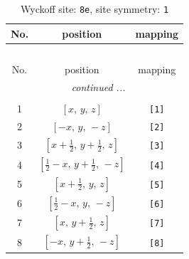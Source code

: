 \documentclass[fleqn,8pt]{jsarticle}
\begin{document}
\renewcommand{\arraystretch}{1.2}
\begin{longtable}{ccc}
\caption{Wyckoff site: {\tt 8e}, site symmetry: {\tt 1}}
 \\
 \hline \hline
No. & position & mapping \\ \hline \endfirsthead

\multicolumn{2}{l}{\tablename\ \thetable{}} \\
 \hline \hline
No. & position & mapping \\ \hline \endhead

 \hline \hline
\multicolumn{2}{r}{\footnotesize\it continued ...} \\ \endfoot

 \hline \hline
\multicolumn{2}{r}{} \\ \endlastfoot

1 & $\left[ x,\, y,\, z \right]$ & {\tt [1]} \\ \hline
2 & $\left[ - x,\, y,\, - z \right]$ & {\tt [2]} \\ \hline
3 & $\left[ x + \frac{1}{2},\, y + \frac{1}{2},\, z \right]$ & {\tt [3]} \\ \hline
4 & $\left[ \frac{1}{2} - x,\, y + \frac{1}{2},\, - z \right]$ & {\tt [4]} \\ \hline
5 & $\left[ x + \frac{1}{2},\, y,\, z \right]$ & {\tt [5]} \\ \hline
6 & $\left[ \frac{1}{2} - x,\, y,\, - z \right]$ & {\tt [6]} \\ \hline
7 & $\left[ x,\, y + \frac{1}{2},\, z \right]$ & {\tt [7]} \\ \hline
8 & $\left[ - x,\, y + \frac{1}{2},\, - z \right]$ & {\tt [8]} \\
\end{longtable}
\end{document}
